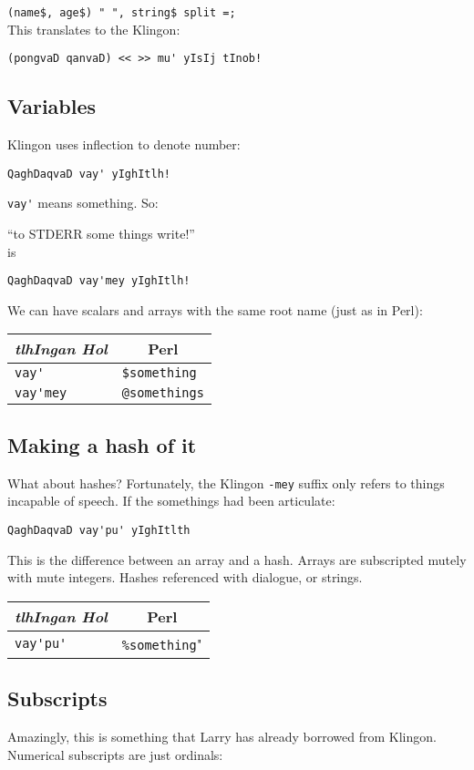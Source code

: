 \documentclass{article}
\begin{document}
\verb'(name$, age$) " ", string$ split =;'\\
This translates to the Klingon:

\verb"(pongvaD qanvaD) << >> mu' yIsIj tInob!"

\subsection{Variables}
Klingon uses inflection to denote number:

\verb"QaghDaqvaD vay' yIghItlh!"

\verb"vay'" means something.  So:

``to STDERR some things write!''\\
is

\verb"QaghDaqvaD vay'mey yIghItlh!"

We can have scalars and arrays with the same root name (just as in
Perl):

\begin{center}
\begin{tabular}{l|l}
\multicolumn{1}{c|}{\it tlhIngan Hol} & \multicolumn{1}{c}{Perl}\\\hline
\verb"vay'" & \verb'$something'\\
\verb"vay'mey" & \verb'@somethings'
\end{tabular}
\end{center}

\subsection{Making a hash of it}
What about hashes?  Fortunately, the Klingon \verb'-mey' suffix only 
refers to things incapable of speech.  If the somethings had been 
articulate:

\verb"QaghDaqvaD vay'pu' yIghItlth"

This is the difference between an array and a hash.  Arrays are
subscripted mutely with mute integers.  Hashes referenced with
dialogue, or strings.

\begin{center}
\begin{tabular}{l|l}
\multicolumn{1}{c|}{\it tlhIngan Hol} & \multicolumn{1}{c}{Perl}\\\hline
\verb"vay'pu'" & \verb"%something"
\end{tabular}
\end{center}

\subsection{Subscripts}
Amazingly, this is something that Larry has already borrowed from
Klingon.  Numerical subscripts are just ordinals:
\end{document}
